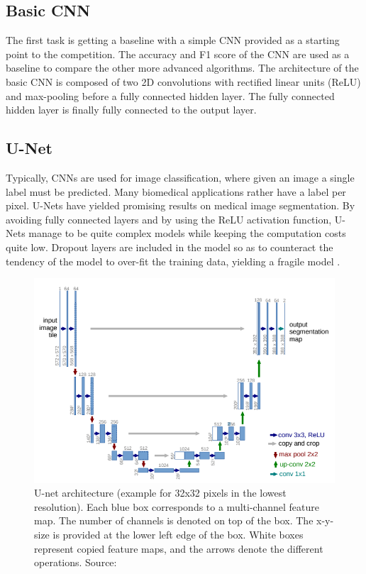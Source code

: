 \documentclass[10pt,conference,a4paper]{IEEEtran}
\begin{document}
\subsection{Basic CNN}

The first task is getting a baseline with a simple CNN provided as a starting point to the competition.
The accuracy and F1 score of the CNN are used as a baseline to compare the other more advanced algorithms.
The architecture of the basic CNN is composed of two 2D convolutions with rectified linear units (ReLU) and max-pooling before a fully connected hidden layer.
The fully connected hidden layer is finally fully connected to the output layer.   

\subsection{U-Net}
\label{sec:unet}

Typically, CNNs are used for image classification, where given an image a single label must be predicted.
Many biomedical applications rather have a label per pixel.
U-Nets have yielded promising results on medical image segmentation.
By avoiding fully connected layers and by using the ReLU activation function, U-Nets manage to be quite complex models while keeping the computation costs quite low.
Dropout layers are included in the model so as to counteract the tendency of the model to over-fit the training data, yielding a fragile model \cite{dropout}.

\begin{figure}[ht]
\centering
\includegraphics[scale=0.45]{project2/report/images/Unet.PNG}
\caption{U-net architecture (example for 32x32 pixels in the lowest resolution).
Each blue box corresponds to a multi-channel feature map.
The number of channels is denoted on top of the box.
The x-y-size is provided at the lower left edge of the box.
White boxes represent copied feature maps, and the arrows denote the different operations.
Source: \cite{unet}}
\label{unet_arch}
\end{figure}
\end{document}
